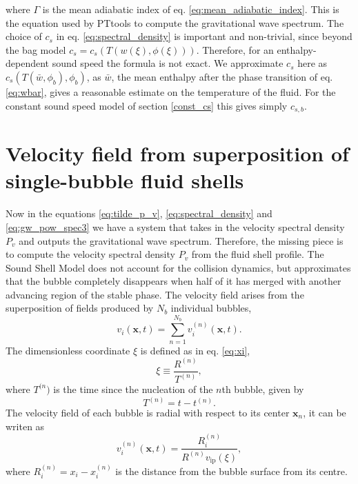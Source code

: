 where $\Gamma$ is the mean adiabatic index of eq. \eqref{eq:mean_adiabatic_index}.
This is the equation used by PTtools to compute the gravitational wave spectrum.
The choice of $c_s$ in eq. \eqref{eq:spectral_density} is important and non-trivial,
since beyond the bag model $c_s = c_s(T(w(\xi),\phi(\xi)))$.
Therefore, for an enthalpy-dependent sound speed the formula is not exact.
We approximate $c_s$ here as $c_s(T(\bar{w},\phi_b),\phi_b)$,
as $\bar{w}$, the mean enthalpy after the phase transition of eq. \eqref{eq:wbar},
gives a reasonable estimate on the temperature of the fluid.
For the constant sound speed model of section \ref{const_cs} this gives simply $c_{s,b}$.


\section{Velocity field from superposition of single-bubble fluid shells}
\label{velocity_field}
Now in the equations \eqref{eq:tilde_p_v}, \eqref{eq:spectral_density} and \eqref{eq:gw_pow_spec3} we have a system that takes in the velocity spectral density $P_v$ and outputs the gravitational wave spectrum.
Therefore, the missing piece is to compute the velocity spectral density $P_v$ from the fluid shell profile.
The Sound Shell Model does not account for the collision dynamics, but approximates that the bubble completely disappears when half of it has merged with another advancing region of the stable phase.
The velocity field arises from the superposition of fields produced by $N_b$ individual bubbles,
\cite[eq. 4.1]{hindmarsh_gw_pt_2019}
\begin{equation}
v_i(\mathbf{x},t) = \sum_{n=1}^{N_b} v_i^{(n)} (\mathbf{x},t).
\end{equation}
The dimensionless coordinate $\xi$ is defined as in eq. \eqref{eq:xi},
\begin{equation}
\xi \equiv \frac{R^{(n)}}{T^{(n)}},
\end{equation}
where $T^{(n})$ is the time since the nucleation of the $n$th bubble, given by
\begin{equation}
T^{(n)} = t - t^{(n)}.
\label{eq:bubble_lifetime}
\end{equation}
The velocity field of each bubble is radial with respect to its center $\mathbf{x}_n$, it can be writen as
\cite[eq. 4.2]{hindmarsh_gw_pt_2019}
\begin{equation}
v_i^{(n)}(\mathbf{x},t) = \frac{R_i^{(n)}}{R^{(n)} v_\text{ip}(\xi)},
\end{equation}
where $R_i^{(n)} = x_i - x_i^{(n)}$ is the distance from the bubble surface from its centre.
